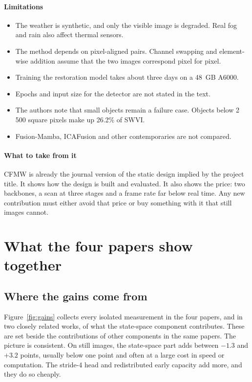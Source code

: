 \paragraph{Limitations}
\begin{itemize}
  \item The weather is synthetic, and only the visible image is degraded.
        Real fog and rain also affect thermal sensors.
  \item The method depends on pixel-aligned pairs. Channel swapping and
        element-wise addition assume that the two images correspond pixel
        for pixel.
  \item Training the restoration model takes about three days on a 48~GB
        A6000.
  \item Epochs and input size for the detector are not stated in the text.
  \item The authors note that small objects remain a failure case. Objects
        below 2\,500 square pixels make up 26.2\% of SWVI.
  \item Fusion-Mamba, ICAFusion and other contemporaries are not compared.
\end{itemize}

\paragraph{What to take from it}
CFMW is already the journal version of the static design implied by the
project title. It shows how the design is built and evaluated. It also shows
the price: two backbones, a scan at three stages and a frame rate far below
real time. Any new contribution must either avoid that price or buy
something with it that still images cannot.

\section{What the four papers show together}
\label{sec:src-synthesis}

\subsection{Where the gains come from}

Figure~\ref{fig:gains} collects every isolated measurement in the four
papers, and in two closely related works, of what the state-space component
contributes. These are set beside the contributions of other components in
the same papers. The picture is consistent. On still images, the
state-space part adds between $-1.3$ and $+3.2$ points, usually below one
point and often at a large cost in speed or computation. The stride-4 head
and redistributed early capacity add more, and they do so cheaply.

